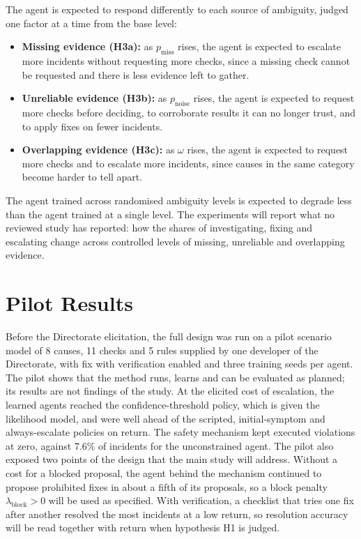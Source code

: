 The agent is expected to respond differently to each source of ambiguity, judged one factor at a time from the base level:
\begin{itemize}
\item \textbf{Missing evidence (H3a):} as $p_{\text{miss}}$ rises, the agent is expected to escalate more incidents without requesting more checks, since a missing check cannot be requested and there is less evidence left to gather.
\item \textbf{Unreliable evidence (H3b):} as $p_{\text{noise}}$ rises, the agent is expected to request more checks before deciding, to corroborate results it can no longer trust, and to apply fixes on fewer incidents.
\item \textbf{Overlapping evidence (H3c):} as $\omega$ rises, the agent is expected to request more checks and to escalate more incidents, since causes in the same category become harder to tell apart.
\end{itemize}
The agent trained across randomised ambiguity levels is expected to degrade less than the agent trained at a single level. The experiments will report what no reviewed study has reported: how the shares of investigating, fixing and escalating change across controlled levels of missing, unreliable and overlapping evidence.

\section{Pilot Results}

Before the Directorate elicitation, the full design was run on a pilot scenario model of 8 causes, 11 checks and 5 rules supplied by one developer of the Directorate, with fix with verification enabled and three training seeds per agent. The pilot shows that the method runs, learns and can be evaluated as planned; its results are not findings of the study. At the elicited cost of escalation, the learned agents reached the confidence-threshold policy, which is given the likelihood model, and were well ahead of the scripted, initial-symptom and always-escalate policies on return. The safety mechanism kept executed violations at zero, against 7.6\% of incidents for the unconstrained agent. The pilot also exposed two points of the design that the main study will address. Without a cost for a blocked proposal, the agent behind the mechanism continued to propose prohibited fixes in about a fifth of its proposals, so a block penalty $\lambda_{\text{block}} > 0$ will be used as specified. With verification, a checklist that tries one fix after another resolved the most incidents at a low return, so resolution accuracy will be read together with return when hypothesis H1 is judged.

